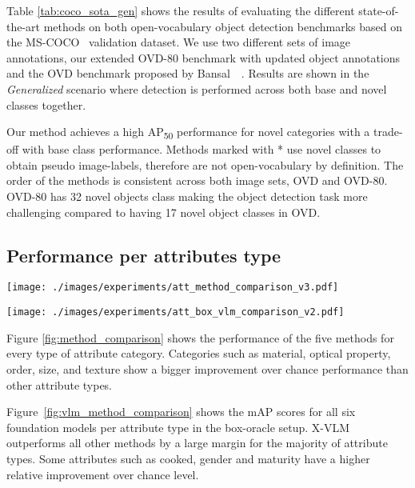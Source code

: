 \documentclass[10pt,twocolumn,letterpaper]{article}
\newcommand{\datasetname}{OVAD}
\begin{document}
 Table \ref{tab:coco_sota_gen} shows the results of evaluating the different state-of-the-art methods on both open-vocabulary object detection benchmarks based on the MS-COCO~\cite{coco} validation dataset. We use two different sets of image annotations, our extended OVD-80 benchmark with updated object annotations and the OVD benchmark proposed by Bansal~\etal~\cite{bansal2018zero}. Results are shown in the \textit{Generalized} scenario where detection is performed across both base and novel classes together. 

Our method achieves a high AP\textsubscript{50} performance for novel categories with a trade-off with base class performance. Methods marked with * use novel classes to obtain pseudo image-labels, therefore are not open-vocabulary by definition. The order of the methods is consistent across both image sets, OVD and OVD-80. OVD-80 has 32 novel objects class making the object detection task more challenging compared to having 17 novel object classes in OVD.  
\subsection{Performance per attributes type}

\begin{figure*}[t]
\centering
\texttt{[image: ./images/experiments/att\_method\_comparison\_v3.pdf]}
\caption{Comparison between different baseline methods on open-vocabulary attribute detection on the \datasetname\ benchmark. }
\label{fig:method_comparison}
\end{figure*}

\begin{figure*}[t]
\centering
\texttt{[image: ./images/experiments/att\_box\_vlm\_comparison\_v2.pdf]}
\caption{Comparison between different the different foundation models on the box-oracle \datasetname\ benchmark. }
\label{fig:vlm_method_comparison}
\end{figure*} Figure \ref{fig:method_comparison} shows the performance of the five methods for every type of attribute category. Categories such as material, optical property, order, size, and texture show a bigger improvement over chance performance than other attribute types.


Figure~\ref{fig:vlm_method_comparison} shows the mAP scores for all six foundation models per attribute type in the box-oracle setup. X-VLM outperforms all other methods by a large margin for the majority of attribute types. Some attributes such as cooked, gender and maturity have a higher relative improvement over chance level.  
\end{document}
